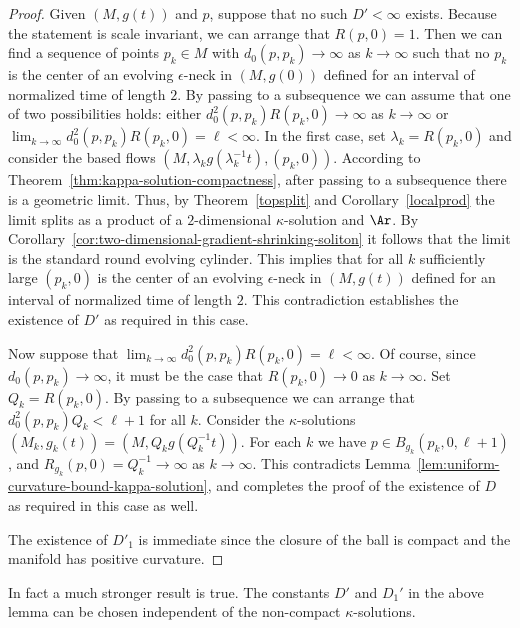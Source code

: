 \begin{proof}
 Given $(M,g(t))$ and $p$, suppose that no such $D'<\infty$ exists.
Because the statement is scale invariant, we can arrange that
$R(p,0)=1$.
 Then we
can find a sequence of points $p_k\in M$ with $d_0(p,p_k)\rightarrow
\infty$ as $k\rightarrow \infty$ such that no $p_k$ is the center of
an evolving $\epsilon$-neck in $(M,g(0))$ defined for an interval of
normalized time of length  $2$. By passing to a subsequence we can
assume that one of two possibilities holds: either
$d_0^2(p,p_k)R(p_k,0)\rightarrow\infty$ as $k\rightarrow\infty$ or
$\lim_{k\rightarrow\infty}d_0^2(p,p_k)R(p_k,0)=\ell<\infty$. In
the first case,  set $\lambda_k=R(p_k,0)$ and consider the based
flows $(M,\lambda_kg(\lambda_k^{-1}t),(p_k,0))$. According to
Theorem~\ref{thm:kappa-solution-compactness}, after passing to a subsequence there is
a geometric limit. Thus, by Theorem~\ref{topsplit} and
Corollary~\ref{localprod} the limit splits as a product of a
$2$-dimensional $\kappa$-solution and $\Ar$. By
Corollary~\ref{cor:two-dimensional-gradient-shrinking-soliton} it follows that the limit is the standard
round evolving cylinder. This implies that for all $k$ sufficiently
large $(p_k,0)$ is the center of an evolving $\epsilon$-neck in
$(M,g(t))$ defined for an interval of normalized time of length
$2$. This contradiction establishes the existence of $D'$ as
required in this case.

Now suppose that $\lim_{k\rightarrow\infty}d_0^2(p,p_k)R(p_k,0)=\ell<\infty$. Of
course, since $d_0(p,p_k)\rightarrow\infty$, it must be the case
that $R(p_k,0)\rightarrow 0$ as $k\rightarrow \infty$. Set
$Q_k=R(p_k,0)$. By passing to a subsequence we can arrange that
$d_0^2(p,p_k)Q_k< \ell+1$ for all $k$. Consider the
$\kappa$-solutions $(M_k,g_k(t))=(M,Q_kg(Q_k^{-1}t))$. For each $k$
we have $p\in B_{g_k}(p_k,0,\ell+1)$, and
$R_{g_k}(p,0)=Q_k^{-1}\rightarrow\infty$ as $k\rightarrow\infty$.
This contradicts Lemma~\ref{lem:uniform-curvature-bound-kappa-solution}, and completes the proof of
the existence of $D$ as required in this case as well.



 The existence of $D'_1$ is immediate since the
closure of the ball is compact and the manifold has positive
curvature.
\end{proof}

In fact a much stronger result is true. The constants $D'$ and
$D_1'$ in the above lemma can be chosen independent of the
non-compact $\kappa$-solutions.


